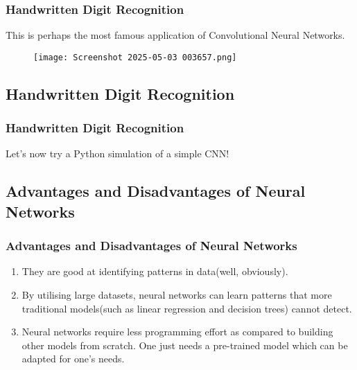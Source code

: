 \documentclass{beamer}
\begin{document}
\begin{frame}
\frametitle{Handwritten Digit Recognition}
\begin{tcolorbox}
[colback=blue!5!white,colframe=blue!75!black,title= Schematic Flow of Digit Recognition by CNNs]
This is perhaps the most famous application of Convolutional Neural Networks.
\begin{figure}
    \centering
    \texttt{[image: Screenshot 2025-05-03 003657.png]}
\end{figure}
\end{tcolorbox}
\end{frame}
\begin{frame}
\section[Handwritten Digit Recognition]{Handwritten Digit Recognition}
\frametitle{Handwritten Digit Recognition}
\begin{tcolorbox}
[colback=blue!5!white,colframe=blue!75!black, title = Handwritten Digit Recognition]
Let's now try a Python simulation of a simple CNN!
\end{tcolorbox}
\end{frame}
\begin{frame}
\section{Advantages and Disadvantages of Neural Networks}
\frametitle{Advantages and Disadvantages of Neural Networks}
\begin{tcolorbox}
[colback=blue!5!white,colframe=blue!75!black,title= Advantages of Neural Networks]
\begin{enumerate}
    \item They are good at identifying patterns in data(well, obviously).
    \item By utilising large datasets, neural networks can learn patterns that more traditional models(such as linear regression and decision trees) cannot detect.
    \item Neural networks require less programming effort as compared to building other models from scratch. One just needs a pre-trained model which can be adapted for one's needs.
\end{enumerate}
\end{tcolorbox}
\end{frame}
\end{document}
